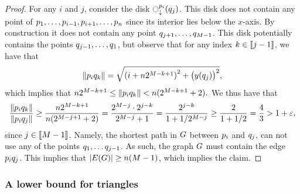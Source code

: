 \documentclass[12pt]{article}%
\begin{document}
\begin{proof}
    For any $i$ and $j$, consider the disk
    $\diskVY{\pa_i}{\pb_j}$. This disk does not contain any point of
    $p_1,\ldots, p_{i-1}, p_{i+1}, \ldots, p_{n}$ since its
    interior lies below the $x$-axis. By construction it does not
    contain any point $q_{j+1}, \ldots, q_{M-1}$. This disk
    potentially contains the points $q_{j-1}, \ldots, q_1$, but
    observe that for any index $k \in \IRX{j-1}$, we have that
    \begin{equation*}
        \dY{\pa_i}{\pb_k} %
        =%
        \sqrt{ \pth{i + n 2^{M-k+1} }^2 + \bigl( y(\pb_j) \bigr)^2 },
    \end{equation*}
    which implies that
    \begin{math}
        n 2^{M-k+1}%
        \leq%
        \dY{\pa_i}{\pb_k} %
        <%
        n( 2^{M-k+1} +2).
    \end{math}
    We thus have that
    \begin{equation*}
        \frac{\dY{\pa_i}{\pb_k}}{\dY{\pa_i}{\pb_j}}
        \geq%
        \frac{n 2^{M-k+1}}{n( 2^{M-j+1} +2)}
        =%
        \frac{ 2^{M-j}\cdot 2^{j-k}}{ 2^{M-j} +1}
        =%
        \frac{  2^{j-k}}{ 1 + 1/2^{M-j}}
        \geq
        \frac{2}{1+1/2}
        = \frac{4}{3}
        > 1+\eps,
    \end{equation*}
    since $j \in \IRX{M-1}$.  Namely, the shortest path in $G$
    between $p_i$ and $q_j$, can not use any of the points
    $q_{1}, \ldots q_{j-1}$. As such, the graph $G$ must contain
    the edge $p_i q_j$. This implies that
    $|\EGX{\G}| \geq n (M-1)$, which implies the claim.
\end{proof}



\subsubsection{A lower bound for triangles}
\end{document}
